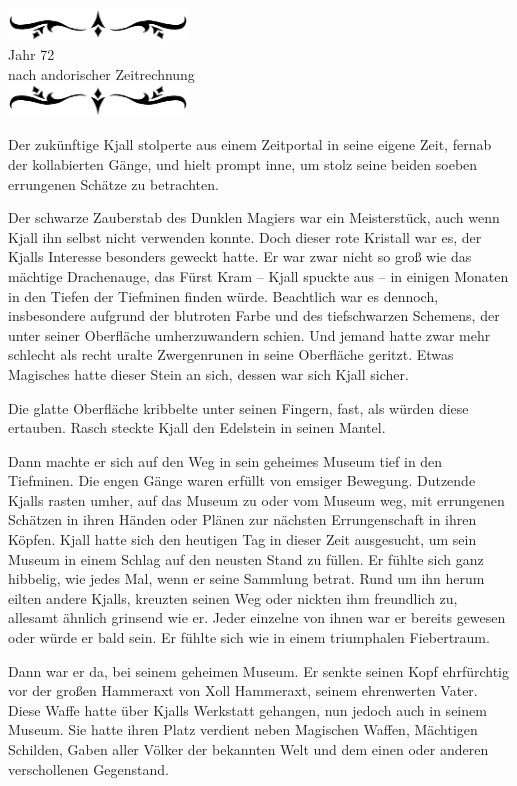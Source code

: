 \documentclass[10pt, a4paper, oneside]{book}
\newcommand{\az}[1]{%
    \begin{center}
        \includegraphics[width=180px]{Das Erbe des Wunderkindes/verzierung1.png}\\
        {\Huge #1} \\
        {nach andorischer Zeitrechnung}\\
        \includegraphics[width=180px]{Das Erbe des Wunderkindes/verzierung2.png}
    \end{center}
    \extramarks{}{#1 a.Z.}
}
\begin{document}
\az{Jahr 72}


Der zukünftige Kjall stolperte aus einem Zeitportal in seine eigene Zeit, fernab der kollabierten Gänge, und hielt prompt inne, um stolz seine beiden soeben errungenen Schätze zu betrachten.

Der schwarze Zauberstab des Dunklen Magiers war ein Meisterstück, auch wenn Kjall ihn selbst nicht verwenden konnte. Doch dieser rote Kristall war es, der Kjalls Interesse besonders geweckt hatte. Er war zwar nicht so groß wie das mächtige Drachenauge, das Fürst Kram – Kjall spuckte aus – in einigen Monaten in den Tiefen der Tiefminen finden würde. Beachtlich war es dennoch, insbesondere aufgrund der blutroten Farbe und des tiefschwarzen Schemens, der unter seiner Oberfläche umherzuwandern schien. Und jemand hatte zwar mehr schlecht als recht uralte Zwergenrunen in seine Oberfläche geritzt. Etwas Magisches hatte dieser Stein an sich, dessen war sich Kjall sicher.

Die glatte Oberfläche kribbelte unter seinen Fingern, fast, als würden diese ertauben. Rasch steckte Kjall den Edelstein in seinen Mantel.

Dann machte er sich auf den Weg in sein geheimes Museum tief in den Tiefminen. Die engen Gänge waren erfüllt von emsiger Bewegung. Dutzende Kjalls rasten umher, auf das Museum zu oder vom Museum weg, mit errungenen Schätzen in ihren Händen oder Plänen zur nächsten Errungenschaft in ihren Köpfen. Kjall hatte sich den heutigen Tag in dieser Zeit ausgesucht, um sein Museum in einem Schlag auf den neusten Stand zu füllen. Er fühlte sich ganz hibbelig, wie jedes Mal, wenn er seine Sammlung betrat. Rund um ihn herum eilten andere Kjalls, kreuzten seinen Weg oder nickten ihm freundlich zu, allesamt ähnlich grinsend wie er. Jeder einzelne von ihnen war er bereits gewesen oder würde er bald sein. Er fühlte sich wie in einem triumphalen Fiebertraum.

Dann war er da, bei seinem geheimen Museum. Er senkte seinen Kopf ehrfürchtig vor der großen Hammeraxt von Xoll Hammeraxt, seinem ehrenwerten Vater. Diese Waffe hatte über Kjalls Werkstatt gehangen, nun jedoch auch in seinem Museum. Sie hatte ihren Platz verdient neben Magischen Waffen, Mächtigen Schilden, Gaben aller Völker der bekannten Welt und dem einen oder anderen verschollenen Gegenstand.
\end{document}
